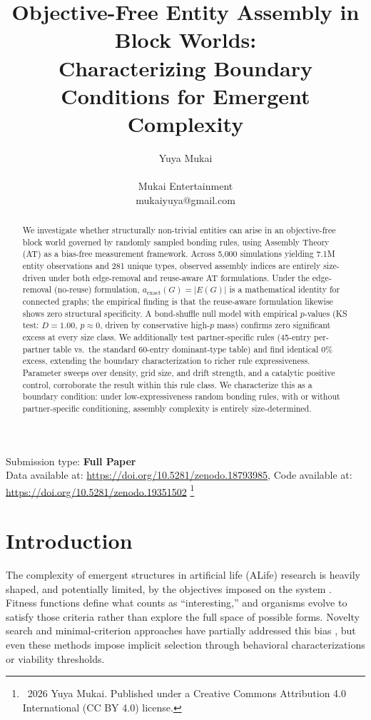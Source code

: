 \documentclass[letterpaper]{article}
\title{Objective-Free Entity Assembly in Block Worlds:\\
Characterizing Boundary Conditions for Emergent Complexity}
\author{
    Yuya Mukai\\
    \mbox{}\\
    Mukai Entertainment\\
    mukaiyuya@gmail.com
}
\newcommand\blfootnote[1]{%
  \begingroup
  \renewcommand\thefootnote{}\footnote{#1}%
  \addtocounter{footnote}{-1}%
  \endgroup
}
\begin{document}
\maketitle

\begin{abstract}
We investigate whether structurally non-trivial entities can arise in an
objective-free block world governed by randomly sampled bonding rules,
using Assembly Theory (AT) as a bias-free measurement framework. Across
5{,}000 simulations yielding 7.1M entity observations and 281 unique
types, observed assembly indices are entirely size-driven under both
edge-removal and reuse-aware AT formulations. Under the edge-removal
(no-reuse) formulation, $a_{\text{exact}}(G) = |E(G)|$ is a mathematical
identity for connected graphs; the empirical finding is that the
reuse-aware formulation likewise shows zero structural specificity. A
bond-shuffle null model with empirical $p$-values (KS test: $D = 1.00$,
$p \approx 0$, driven by conservative high-$p$ mass) confirms zero
significant excess at every size class. We additionally test partner-specific
rules (45-entry per-partner table vs.\ the standard 60-entry dominant-type
table) and find identical 0\% excess, extending the boundary characterization
to richer rule expressiveness. Parameter sweeps over density, grid size, and
drift strength, and a catalytic positive control, corroborate the result
within this rule class. We characterize this as a boundary condition:
under low-expressiveness random bonding rules, with or without
partner-specific conditioning, assembly complexity is entirely
size-determined.
\end{abstract}

Submission type: \textbf{Full Paper}\\

Data available at: \url{https://doi.org/10.5281/zenodo.18793985},
Code available at: \url{https://doi.org/10.5281/zenodo.19351502}
\blfootnote{\textcopyright\ 2026 Yuya Mukai. Published under a Creative Commons Attribution 4.0 International (CC BY 4.0) license.}


\section{Introduction}

The complexity of emergent structures in artificial life (ALife) research
is heavily shaped, and potentially limited, by the objectives imposed on
the system
\citep{bedau2000openproblems, taylor2016openended}. Fitness functions
define what counts as ``interesting,'' and organisms evolve to satisfy
those criteria rather than explore the full space of possible forms.
Novelty search and minimal-criterion approaches have partially addressed
this bias \citep{lehman2011novelty, brant2017minimalcriterion}, but even
these methods impose implicit selection through behavioral
characterizations or viability thresholds.
\end{document}
